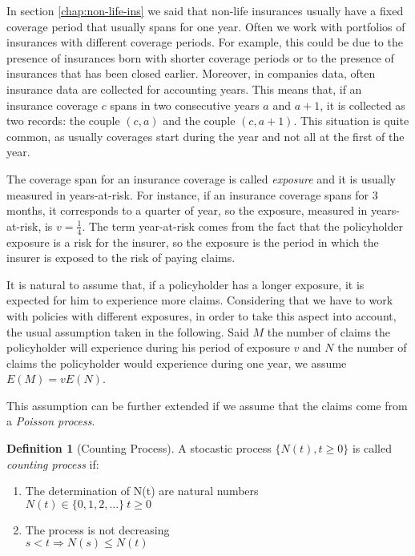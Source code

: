 \documentclass[a4paper, nobind]{templates/ociamthesis}
\theoremstyle{definition}
\newtheorem{definition}{Definition}[chapter]
\theoremstyle{definition}
\theoremstyle{definition}
\theoremstyle{remark}
\begin{document}
In section \ref{chap:non-life-ins} we said that non-life insurances usually have a fixed coverage period that usually spans for one year. Often we work with portfolios of insurances with different coverage periods. For example, this could be due to the presence of insurances born with shorter coverage periods or to the presence of insurances that has been closed earlier. Moreover, in companies data, often insurance data are collected for accounting years. This means that, if an insurance coverage \(c\) spans in two consecutive years \(a\) and \(a+1\), it is collected as two records: the couple \((c, a)\) and the couple \((c, a+1)\). This situation is quite common, as usually coverages start during the year and not all at the first of the year.

The coverage span for an insurance coverage is called \emph{exposure} and it is usually measured in years-at-risk. For instance, if an insurance coverage spans for 3 months, it corresponds to a quarter of year, so the exposure, measured in years-at-risk, is \(v=\frac{1}{4}\). The term year-at-risk comes from the fact that the policyholder exposure is a risk for the insurer, so the exposure is the period in which the insurer is exposed to the risk of paying claims.

It is natural to assume that, if a policyholder has a longer exposure, it is expected for him to experience more claims. Considering that we have to work with policies with different exposures, in order to take this aspect into account, the usual assumption taken in the following. Said \(M\) the number of claims the policyholder will experience during his period of exposure \(v\) and \(N\) the number of claims the policyholder would experience during one year, we assume \(E(M) = v E(N)\).

This assumption can be further extended if we assume that the claims come from a \emph{Poisson process}.

\begin{definition}[Counting Process]
\label{def:def-process-count} \iffalse (Counting Process) \fi{} A stocastic process \(\{N(t), t\ge0\}\) is called \textit{counting process} if:

\begin{enumerate}
\item The determination of N(t) are natural numbers \\
      $N(t) \in \{ 0, 1, 2, ... \} \ t\ge 0$
\item The process is not decreasing \\
      $s < t \Rightarrow N(s) \le N(t)$
\end{enumerate}
\end{definition}
\end{document}

